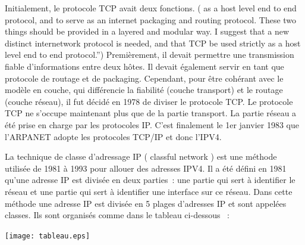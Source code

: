 \documentclass[twoside,openright,a4paper,11pt,french]{article}
\begin{document}
Initialement, le protocole TCP avait deux fonctions. ( as a host level end to end protocol, and to serve as an internet packaging and routing protocol. These two things should be provided in a layered and modular way. I suggest that a new distinct internetwork protocol is needed, and that TCP be used strictly as a host level end to end protocol.”) Premièrement, il devait permettre une transmission fiable d'informations entre deux hôtes. Il devait également servir en tant que protocole de routage et de packaging. Cependant, pour être cohérant avec le modèle en couche, qui différencie la fiabilité (couche transport) et le routage (couche réseau), il fut décidé en 1978 de diviser le protocole TCP. Le protocole TCP ne s'occupe maintenant plus que de la partie transport. La partie réseau a été prise en charge par les protocoles IP.
C'est finalement le 1er janvier 1983 que l'ARPANET adopte les protocoles TCP/IP et donc l'IPV4. 



La technique de classe d'adressage IP ( classful network ) est une méthode utilisée de 1981 à 1993 pour allouer des adresses IPV4. Il a été défini en 1981 qu'une adresse IP est divisée en deux parties : une partie qui sert à identifier le réseau et une partie qui sert à identifier une interface sur ce réseau.
Dans cette méthode une adresse IP est divisée en 5 plages d'adresses IP et sont appelées classes. Ils sont organisés comme dans le tableau ci-dessous  :

\texttt{[image: tableau.eps]}
\end{document}
